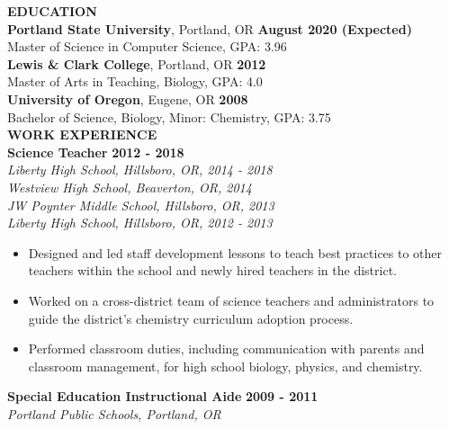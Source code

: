 \documentclass[11pt]{article}
\begin{document}
\noindent
\makebox[0pt][l]{\rule[-.2\baselineskip]{\linewidth}{.3mm}}%
\large{\textbf{EDUCATION}} \smallskip \\
%
\textbf{Portland State University}, Portland, OR
\hfill \textbf{August 2020 (Expected)}\\ 
Master of Science in Computer Science, GPA: 3.96
\medskip \\
%
\textbf{Lewis \& Clark College}, Portland, OR
\hfill \textbf{2012} \\
Master of Arts in Teaching, Biology, GPA: 4.0\medskip \\
%
\textbf{University of Oregon}, Eugene, OR
\hfill \textbf{2008}\\
Bachelor of Science, Biology, Minor: Chemistry, GPA: 3.75 \bigskip \\
\makebox[0pt][l]{\rule[-.2\baselineskip]{\linewidth}{.3mm}}%
\large{\textbf{WORK EXPERIENCE}}\smallskip \\
%
\textbf{Science Teacher} \hfill \textbf{2012 - 2018}\\
\textit{Liberty High School, Hillsboro, OR, 2014 - 2018}\\
\textit{Westview High School, Beaverton, OR, 2014}\\
\textit{JW Poynter Middle School, Hillsboro, OR, 2013}\\
\textit{Liberty High School, Hillsboro, OR, 2012 - 2013}
\begin{itemize}[leftmargin=*, itemsep=0pt, topsep=5pt]
	\item Designed and led staff development lessons to teach best practices to other teachers within the school and newly hired teachers in the district.
	\item Worked on a cross-district team of science teachers and administrators to guide the district’s chemistry curriculum adoption process.
	\item Performed classroom duties, including communication with parents and classroom management, for high school biology, physics, and chemistry.
\end{itemize}
\medbreak \noindent
%
\textbf{Special Education Instructional Aide} \hfill \textbf{2009 - 2011}\\
\textit{Portland Public Schools, Portland, OR}\\
%
\end{document}
